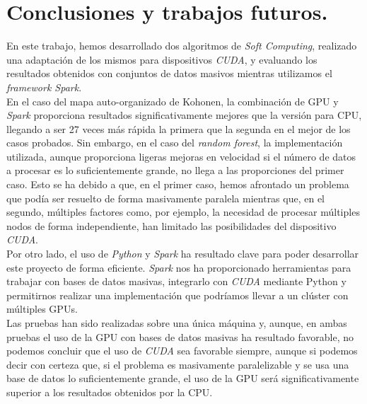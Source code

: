 \chapter{Conclusiones y trabajos futuros.}
En este trabajo, hemos desarrollado dos algoritmos de \textit{Soft Computing}, realizado una adaptación de los mismos para dispositivos \textit{CUDA}, y evaluando los resultados obtenidos con conjuntos de datos masivos mientras utilizamos el \textit{framework Spark}.\\

En el caso del mapa auto-organizado de Kohonen, la combinación de GPU y \textit{Spark} proporciona resultados significativamente mejores que la versión para CPU, llegando a ser 27 veces más rápida la primera que la segunda en el mejor de los casos probados. Sin embargo, en el caso del \textit{random forest}, la implementación utilizada, aunque proporciona ligeras mejoras en velocidad si el número de datos a procesar es lo suficientemente grande, no llega a las proporciones del primer caso. Esto se ha debido a que, en el primer caso, hemos afrontado un problema que podía ser resuelto de forma masivamente paralela mientras que, en el segundo, múltiples factores como, por ejemplo, la necesidad de procesar múltiples nodos de forma independiente, han limitado las posibilidades del dispositivo \textit{CUDA}. \\

Por otro lado, el uso de \textit{Python} y \textit{Spark} ha resultado clave para poder desarrollar este proyecto de forma eficiente. \textit{Spark} nos ha proporcionado herramientas para trabajar con bases de datos masivas, integrarlo con \textit{CUDA} mediante Python y permitirnos realizar una implementación que podríamos llevar a un clúster con múltiples GPUs.\\

Las pruebas han sido realizadas sobre una única máquina y, aunque, en ambas pruebas el uso de la GPU con bases de datos masivas ha resultado favorable, no podemos concluir que el uso de \textit{CUDA} sea favorable siempre, aunque si podemos decir con certeza que, si el problema es masivamente paralelizable y se usa una base de datos lo suficientemente grande, el uso de la GPU será significativamente superior a los resultados obtenidos por la CPU.\\

